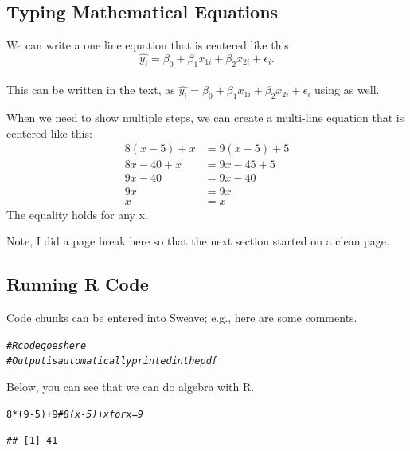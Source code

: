 \documentclass{article}\usepackage[]{graphicx}\usepackage[]{xcolor}
\makeatletter
\newcommand{\hlnum}[1]{\textcolor[rgb]{0.686,0.059,0.569}{#1}}%
\newcommand{\hlcom}[1]{\textcolor[rgb]{0.678,0.584,0.686}{\textit{#1}}}%
\newcommand{\hlopt}[1]{\textcolor[rgb]{0,0,0}{#1}}%
\newcommand{\hldef}[1]{\textcolor[rgb]{0.345,0.345,0.345}{#1}}%
\newenvironment{kframe}{%
 \def\at@end@of@kframe{}%
 \ifinner\ifhmode%
  \def\at@end@of@kframe{\end{minipage}}%
  \begin{minipage}{\columnwidth}%
 \fi\fi%
 \def\FrameCommand##1{\hskip\@totalleftmargin \hskip-\fboxsep
 \colorbox{shadecolor}{##1}\hskip-\fboxsep
     \hskip-\linewidth \hskip-\@totalleftmargin \hskip\columnwidth}%
 \MakeFramed {\advance\hsize-\width
   \@totalleftmargin\z@ \linewidth\hsize
   \@setminipage}}%
 {\par\unskip\endMakeFramed%
 \at@end@of@kframe}
\newenvironment{knitrout}{}{} %
\makeatother
\begin{document}
\begin{multicols}{2}
\subsection{Typing Mathematical Equations}
We can write a one line equation that is centered like this
\[\widehat{y_i} = \beta_0 + \beta_1 x_{1i}+ \beta_2 x_{2i} + \epsilon_i.\] \\
This can be written in the text, as $\widehat{y_i} = \beta_0 + \beta_1 x_{1i}+ \beta_2 x_{2i} + \epsilon_i$ using as well.

When we need to show multiple steps, we can create a multi-line equation that is centered like this:
\begin{align*}
8(x-5)+x&=9(x-5)+5\\
  8x-40+x&=9x-45+5 \tag{Distributing}\\
    9x-40&=9x-40 \tag{Combining like terms}\\
      9x&=9x \tag{Adding 40 to both sides}\\
        x&=x \tag{dividing both sides by 9}
\end{align*}
The equality holds for any x.

Note, I did a page break here so that the next section
started on a clean page.
\pagebreak

\subsection{Running R Code}
Code chunks can be entered into Sweave; e.g., here are some comments.
\begin{knitrout}\scriptsize
{}\color{fgcolor}\begin{kframe}
\begin{alltt}
\hlcom{# R code goes here}
\hlcom{# Output is automatically printed in the pdf}
\end{alltt}
\end{kframe}
\end{knitrout}

Below, you can see that we can do algebra with R.
\begin{knitrout}\scriptsize
{}\color{fgcolor}\begin{kframe}
\begin{alltt}
\hlnum{8}\hlopt{*}\hldef{(}\hlnum{9}\hlopt{-}\hlnum{5}\hldef{)} \hlopt{+} \hlnum{9} \hlcom{# 8(x-5) + x for x=9}
\end{alltt}
\begin{verbatim}
## [1] 41
\end{verbatim}
\end{kframe}
\end{knitrout}


\end{multicols}
\end{document}

